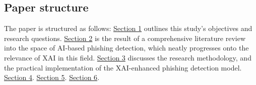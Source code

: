 
\subsection*{Paper structure}

The paper is structured as follows: \hyperref[sec:1-introduction]{Section 1} outlines this study's objectives and research questions. \hyperref[sec:2-literature-review]{Section 2} is the result of a comprehensive literature review into the space of AI-based phishing detection, which neatly progresses onto the relevance of XAI in this field. \hyperref[sec:3-research-methodology]{Section 3} discusses the research methodology, and the practical implementation of the XAI-enhanced phishing detection model. \hyperref[sec:4-results]{Section 4}. \hyperref[sec:5-discussion]{Section 5}. \hyperref[sec:6-conclusion]{Section 6}.

